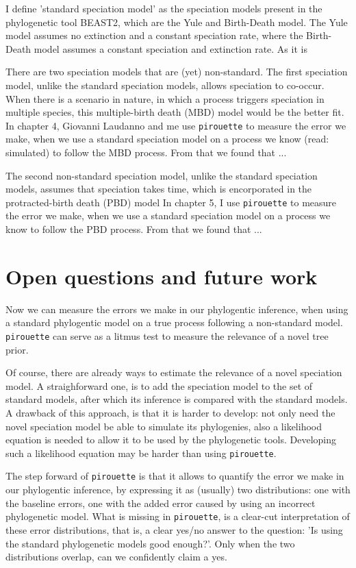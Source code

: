 I define 'standard speciation model' as the speciation models 
present in the phylogenetic tool BEAST2, which are the Yule and
Birth-Death model. The Yule model assumes no extinction
and a constant speciation rate, where the Birth-Death model
assumes a constant speciation and extinction rate. As
it is 

There are two speciation models that are (yet) non-standard.
The first speciation model, 
unlike the standard speciation models, 
allows speciation to co-occur.
When there is a scenario in nature, in which a process triggers speciation
in multiple species, this multiple-birth death (MBD) model would be the better fit. 
In chapter 4, Giovanni Laudanno and me 
use \verb;pirouette; to 
measure the error we make, 
when we use a standard speciation model on a process we know (read: simulated) 
to follow the MBD process.
From that we found that ...

The second non-standard speciation model,
unlike the standard speciation models,
assumes that speciation takes time,
which is encorporated in the protracted-birth death (PBD) model
In chapter 5, I 
use \verb;pirouette; to 
measure the error we make, when we use a standard speciation
model on a process we know to follow the PBD process.
From that we found that ...

\section{Open questions and future work}

Now we can measure the errors we make in our phylogentic
inference, when using a standard phylogentic model on a
true process following a non-standard model. 
\verb;pirouette; can serve as a litmus test 
to measure the relevance of a novel tree prior. 

Of course, there are already ways to estimate the relevance of a
novel speciation model. A straighforward one, is to add the speciation
model to the set of standard models, after which its inference is
compared with the standard models. A drawback of this approach, is
that it is harder to develop: not only need the novel speciation model
be able to simulate its phylogenies, also a likelihood equation is needed
to allow it to be used by the phylogenetic tools. Developing such a
likelihood equation may be harder than using \verb;pirouette;.

The step forward of \verb;pirouette; is that it allows 
to quantify the error we make in our phylogentic inference, by
expressing it as (usually) two distributions: one with the baseline errors,
one with the added error caused by using an incorrect phylogenetic model.
What is missing in \verb;pirouette;, is a clear-cut interpretation of these 
error distributions, that is, a clear yes/no answer to the question: 'Is
using the standard phylogenetic models good enough?'. Only when the two
distributions overlap, can we confidently claim a yes. 

